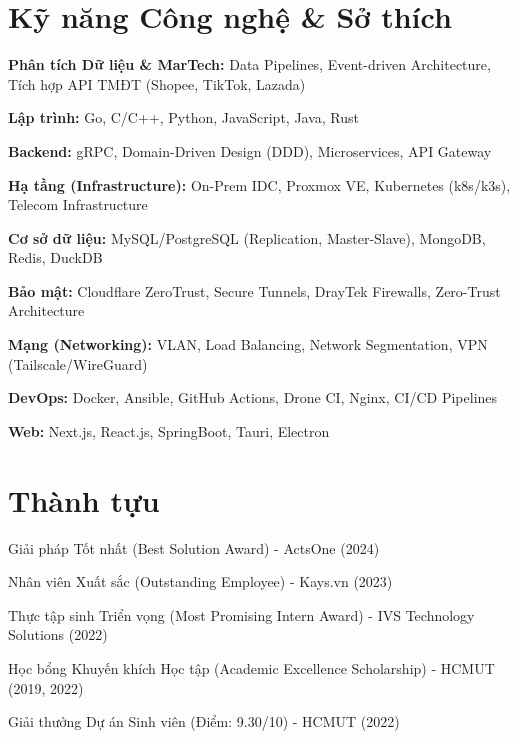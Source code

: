 \section{Kỹ năng Công nghệ \& Sở thích}
\begin{onecolentry}
\begin{highlights}
    \item \textbf{Phân tích Dữ liệu \& MarTech:} Data Pipelines, Event-driven Architecture, Tích hợp API TMĐT (Shopee, TikTok, Lazada)
    \item \textbf{Lập trình:} Go, C/C++, Python, JavaScript, Java, Rust
    \item \textbf{Backend:} gRPC, Domain-Driven Design (DDD), Microservices, API Gateway
    \item \textbf{Hạ tầng (Infrastructure):} On-Prem IDC, Proxmox VE, Kubernetes (k8s/k3s), Telecom Infrastructure
    \item \textbf{Cơ sở dữ liệu:} MySQL/PostgreSQL (Replication, Master-Slave), MongoDB, Redis, DuckDB
    \item \textbf{Bảo mật:} Cloudflare ZeroTrust, Secure Tunnels, DrayTek Firewalls, Zero-Trust Architecture
    \item \textbf{Mạng (Networking):} VLAN, Load Balancing, Network Segmentation, VPN (Tailscale/WireGuard)
    \item \textbf{DevOps:} Docker, Ansible, GitHub Actions, Drone CI, Nginx, CI/CD Pipelines
    \item \textbf{Web:} Next.js, React.js, SpringBoot, Tauri, Electron
\end{highlights}
\end{onecolentry}

\section{Thành tựu}
\begin{onecolentry}
    \begin{highlights}
        \item Giải pháp Tốt nhất (Best Solution Award) - ActsOne (2024)
        \item Nhân viên Xuất sắc (Outstanding Employee) - Kays.vn (2023)
        \item Thực tập sinh Triển vọng (Most Promising Intern Award) - IVS Technology Solutions (2022)
        \item Học bổng Khuyến khích Học tập (Academic Excellence Scholarship) - HCMUT (2019, 2022)
        \item Giải thưởng Dự án Sinh viên (Điểm: 9.30/10) - HCMUT (2022)
    \end{highlights}
\end{onecolentry}
